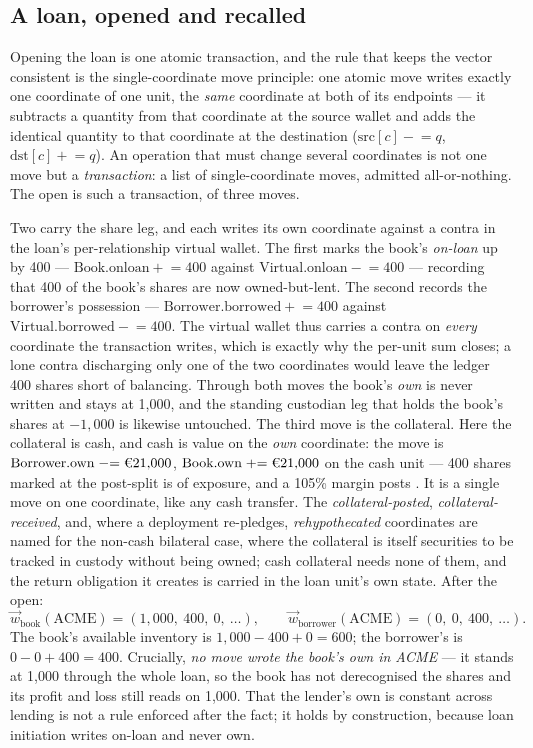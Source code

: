 \subsection{A loan, opened and recalled}

Opening the loan is one atomic transaction, and the rule that keeps the vector
consistent is the single-coordinate move principle: one atomic move writes exactly one
coordinate of one unit, the \emph{same} coordinate at both of its endpoints --- it
subtracts a quantity from that coordinate at the source wallet and adds the identical
quantity to that coordinate at the destination ($\text{src}[c] \mathrel{-}= q$,
$\text{dst}[c] \mathrel{+}= q$). An operation that must change several coordinates is not
one move but a \emph{transaction}: a list of single-coordinate moves, admitted
all-or-nothing. The open is such a transaction, of three moves.

Two carry the share leg, and each writes its own coordinate against a contra in the
loan's per-relationship virtual wallet. The first marks the book's \emph{on-loan} up by
400 --- $\text{Book.onloan} \mathrel{+}= 400$ against $\text{Virtual.onloan} \mathrel{-}=
400$ --- recording that 400 of the book's shares are now owned-but-lent. The second
records the borrower's possession --- $\text{Borrower.borrowed} \mathrel{+}= 400$ against
$\text{Virtual.borrowed} \mathrel{-}= 400$. The virtual wallet thus carries a contra on
\emph{every} coordinate the transaction writes, which is exactly why the per-unit sum
closes; a lone contra discharging only one of the two coordinates would leave the ledger
400 shares short of balancing. Through both moves the book's \emph{own} is never written
and stays at 1{,}000, and the standing custodian leg that holds the book's shares at
$-1{,}000$ is likewise untouched. The third move is the collateral. Here the collateral
is cash, and cash is value on the \emph{own} coordinate: the move is
$\text{Borrower.own} \mathrel{-}= \EUR{21{,}000}$, $\text{Book.own} \mathrel{+}=
\EUR{21{,}000}$ on the cash unit --- 400 shares marked at the post-split  is
 of exposure, and a 105\% margin posts . It is a single move
on one coordinate, like any cash transfer. The \emph{collateral-posted},
\emph{collateral-received}, and, where a deployment re-pledges, \emph{rehypothecated}
coordinates are named for the non-cash bilateral case, where the collateral is itself
securities to be tracked in custody without being owned; cash collateral needs none of
them, and the return obligation it creates is carried in the loan unit's own state.
After the open:
\[
  \vec{w}_{\text{book}}(\text{ACME}) = (1{,}000,\ 400,\ 0,\ \dots), \qquad
  \vec{w}_{\text{borrower}}(\text{ACME}) = (0,\ 0,\ 400,\ \dots).
\]
The book's available inventory is $1{,}000 - 400 + 0 = 600$; the borrower's is
$0 - 0 + 400 = 400$. Crucially, \emph{no move wrote the book's own in ACME} --- it
stands at 1{,}000 through the whole loan, so the book has not derecognised the shares
and its profit and loss still reads on 1{,}000. That the lender's own is constant across
lending is not a rule enforced after the fact; it holds by construction, because loan
initiation writes on-loan and never own.

